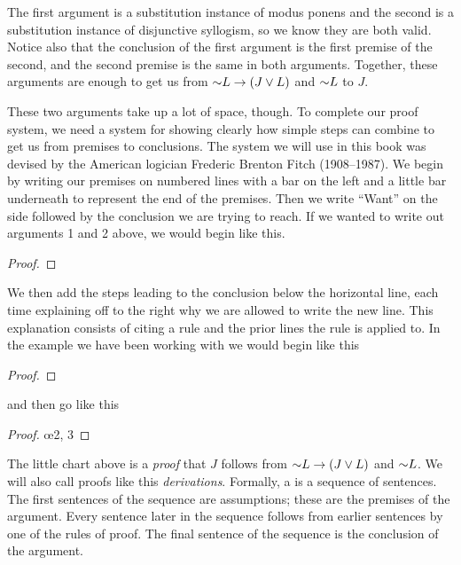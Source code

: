 The first argument is a substitution instance of modus ponens and the second is a substitution instance of disjunctive syllogism, so we know they are both valid. Notice also that the conclusion of the first argument is the first premise of the second, and the second premise is the same in both arguments. Together, these arguments are enough to get us from $\mathord{\sim} L \rightarrow (J \vee L)$ and $\mathord{\sim} L$ to $J$.

These two arguments take up a lot of space, though. To complete our proof system, we need a system for showing clearly how simple steps can combine to get us from premises to conclusions. The system we will use in this book was devised by the American logician Frederic Brenton Fitch (1908--1987). We begin by writing our premises on numbered lines with a bar on the left and a little bar underneath to represent the end of the premises. Then we write ``Want'' on the side followed by the conclusion we are trying to reach. If we wanted to write out arguments 1 and 2 above, we would begin like this.

\begin{proof}
	 			
\end{proof}

We then add the steps leading to the conclusion below the horizontal line, each time explaining off to the right why we are allowed to write the new line. This explanation consists of citing a rule and the prior lines the rule is applied to. In the example we have been working with we would begin like this

\begin{proof}
	 
	 
\end{proof}

and then go like this

\begin{proof}
	 
	 
	 \oe{2, 3}
\end{proof}

The little chart above is a \emph{proof} that $J$ follows from $\mathord{\sim} L \rightarrow (J \vee L)$ and $\mathord{\sim} L$. We will also call proofs like this \emph{derivations}. Formally, a  is a sequence of sentences. The first sentences of the sequence are assumptions; these are the premises of the argument. Every sentence later in the sequence follows from earlier sentences by one of the rules of proof. The final sentence of the sequence is the conclusion of the argument.

